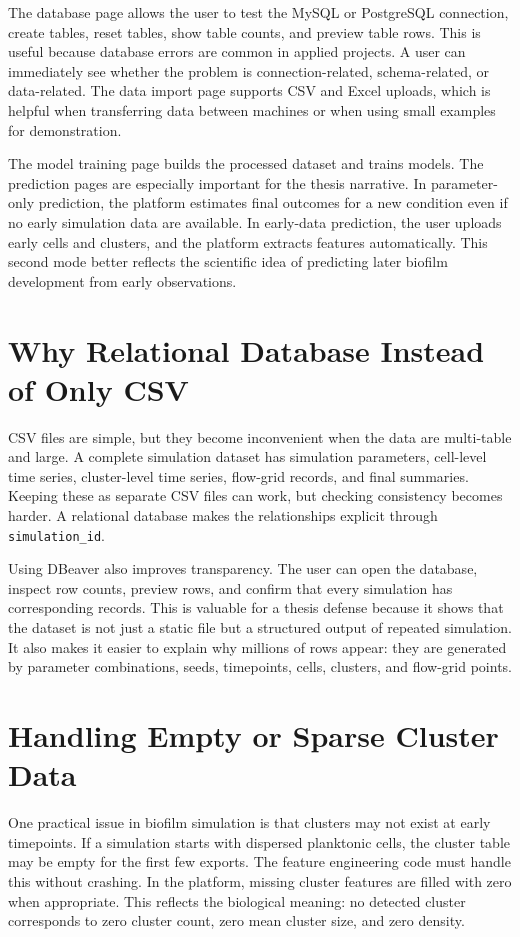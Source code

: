 \documentclass[12pt,a4paper,oneside]{report}
\begin{document}
The database page allows the user to test the MySQL or PostgreSQL connection, create tables, reset tables, show table counts, and preview table rows. This is useful because database errors are common in applied projects. A user can immediately see whether the problem is connection-related, schema-related, or data-related. The data import page supports CSV and Excel uploads, which is helpful when transferring data between machines or when using small examples for demonstration.

The model training page builds the processed dataset and trains models. The prediction pages are especially important for the thesis narrative. In parameter-only prediction, the platform estimates final outcomes for a new condition even if no early simulation data are available. In early-data prediction, the user uploads early cells and clusters, and the platform extracts features automatically. This second mode better reflects the scientific idea of predicting later biofilm development from early observations.

\section{Why Relational Database Instead of Only CSV}
CSV files are simple, but they become inconvenient when the data are multi-table and large. A complete simulation dataset has simulation parameters, cell-level time series, cluster-level time series, flow-grid records, and final summaries. Keeping these as separate CSV files can work, but checking consistency becomes harder. A relational database makes the relationships explicit through \texttt{simulation\_id}.

Using DBeaver also improves transparency. The user can open the database, inspect row counts, preview rows, and confirm that every simulation has corresponding records. This is valuable for a thesis defense because it shows that the dataset is not just a static file but a structured output of repeated simulation. It also makes it easier to explain why millions of rows appear: they are generated by parameter combinations, seeds, timepoints, cells, clusters, and flow-grid points.

\section{Handling Empty or Sparse Cluster Data}
One practical issue in biofilm simulation is that clusters may not exist at early timepoints. If a simulation starts with dispersed planktonic cells, the cluster table may be empty for the first few exports. The feature engineering code must handle this without crashing. In the platform, missing cluster features are filled with zero when appropriate. This reflects the biological meaning: no detected cluster corresponds to zero cluster count, zero mean cluster size, and zero density.
\end{document}

